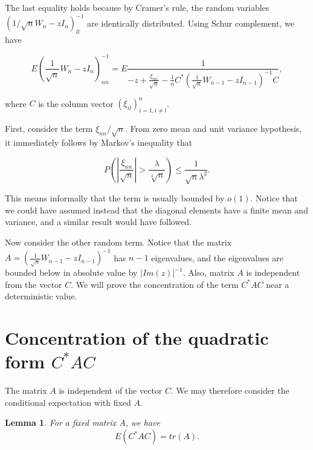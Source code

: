\documentclass[12pt,a4paper,leqno]{report}
\theoremstyle{plain}
\newtheorem{lem}[equation]{Lemma}
\theoremstyle{definition}
\theoremstyle{remark}
\begin{document}
The last equality holds because by Cramer's rule, the random variables $(1/\sqrt{n} W_n - z I_n)^{-1}_{ll}$ are identically distributed.
Using Schur complement, we have

\begin{equation*}
E(\frac{1}{\sqrt{n}}W_n - z I_n)^{-1}_{nn} = E\frac{1}{-z+\frac{\xi_{nn}}{\sqrt{n}}-\frac{1}{n}C^* (\frac{1}{\sqrt{n}}W_{n-1}-zI_{n-1})^{-1}C},
\end{equation*}

where $C$ is the column vector $(\xi_{il})_{i=1, i\neq l}^{n}$.

First, consider the term $\xi_{nn}/\sqrt{n}$. From zero mean and unit variance hypothesis, it immediately follows by Markov's inequality that

\begin{equation*}
P(|\frac{\xi_{nn}}{\sqrt{n}}|>\frac{\lambda}{\sqrt[4]{n}}) \leq \frac{1}{\sqrt{n}\lambda^2}. 
\end{equation*}

This means informally that the term is usually bounded by $o(1)$. Notice that we could have assumed instead that the diagonal elements have a finite mean and variance, and a similar result would have followed.

Now consider the other random term. Notice that the matrix $A = (\frac{1}{\sqrt{n}}W_{n-1}-zI_{n-1})^{-1}$ has $n-1$ eigenvalues, and the eigenvalues are bounded below in absolute value by $|Im(z)|^{-1}$. Also, matrix $A$ is independent from the vector $C$. We will prove the concentration of the term $C^* A C$ near a deterministic value.

\section{Concentration of the quadratic form $C^* A C$}

The matrix $A$ is independent of the vector $C$. We may therefore consider the conditional expectation with fixed $A$.

\begin{lem}
For a fixed matrix $A$, we have
\begin{equation*}
E(C^* A C) = tr(A).
\end{equation*}
\end{lem}
\end{document}

